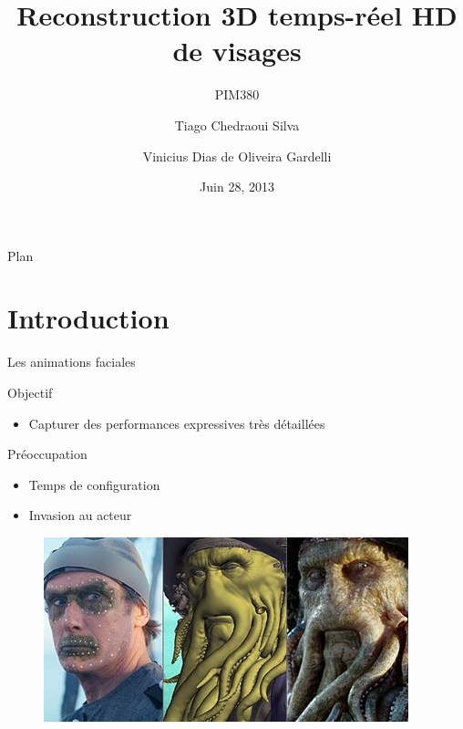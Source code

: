 \documentclass[compress,pdf,11pt,xcolor=dvipsnames]{beamer}
\title{Reconstruction 3D temps-réel HD de visages}
\subtitle{PIM380}
\author[Tiago Siva, Vinicius Gardelli]{
  Tiago Chedraoui Silva \and
  Vinicius Dias de Oliveira Gardelli\\
}
\institute{Télécom Paristech}
\date{Juin 28, 2013}
\begin{document}
\begin{frame}
  \titlepage
\end{frame}

\begin{frame}{Plan}
  \tableofcontents
\end{frame}

\section{Introduction}

\begin{frame}{Les animations faciales}

        \begin{block}{Objectif}
          \begin{itemize}
          \item Capturer des performances expressives très
          détaillées
          \end{itemize}
        \end{block}

        \begin{alertblock}{Préoccupation}
          \begin{itemize}
          \item Temps de configuration 
          \item Invasion au acteur 
          \end{itemize}
        \end{alertblock}

\begin{figure}
  
  \begin{columns}
    \begin{column}{0.5\textwidth}
      \includegraphics[width=\textwidth]{img/Face-Mocap}
    \end{column}
    \begin{column}{0.5\textwidth}
      

\end{column}
\end{columns}
\end{figure}
\end{frame}
\end{document}
